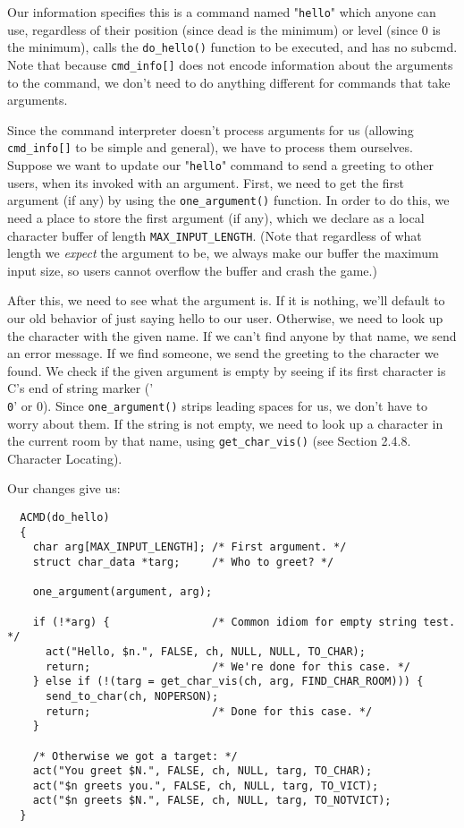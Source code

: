 \documentclass[11pt]{article}
\begin{document}
Our information specifies this is a command named "\texttt{hello}" which anyone can use, regardless of their position (since dead is the minimum) or level (since 0 is the minimum), calls the \texttt{do\_hello()} function to be executed, and has no subcmd.  Note that because \texttt{cmd\_info[]} does not encode information about the arguments to the command, we don't need to do anything different for commands that take arguments.
\par
Since the command interpreter doesn't process arguments for us (allowing \texttt{cmd\_info[]} to be simple and general), we have to process them ourselves.  Suppose we want to update our "\texttt{hello}" command to send a greeting to other users, when its invoked with an argument.  First, we need to get the first argument (if any) by using the \texttt{one\_argument()} function.  In order to do this, we need a place to store the first argument (if any), which we declare as a local character buffer of length \texttt{MAX\_INPUT\_LENGTH}.  (Note that regardless of what length we {\em expect} the argument to be, we always make our buffer the maximum input size, so users cannot overflow the buffer and crash the game.)
\par
After this, we need to see what the argument is.  If it is nothing, we'll default to our old behavior of just saying hello to our user.  Otherwise, we need to look up the character with the given name.  If we can't find anyone by that name, we send an error message.  If we find someone, we send the greeting to the character we found.  We check if the given argument is empty by seeing if its first character is C's end of string marker ('\texttt{\\0}' or 0).  Since \texttt{one\_argument()} strips leading spaces for us, we don't have to worry about them.  If the string is not empty, we need to look up a character in the current room by that name, using \texttt{get\_char\_vis()} (see Section 2.4.8. Character Locating).
\par
Our changes give us:
\begin{verbatim}
  ACMD(do_hello)
  {
    char arg[MAX_INPUT_LENGTH]; /* First argument. */
    struct char_data *targ;     /* Who to greet? */

    one_argument(argument, arg);

    if (!*arg) {                /* Common idiom for empty string test. */
      act("Hello, $n.", FALSE, ch, NULL, NULL, TO_CHAR);
      return;                   /* We're done for this case. */
    } else if (!(targ = get_char_vis(ch, arg, FIND_CHAR_ROOM))) {
      send_to_char(ch, NOPERSON);
      return;                   /* Done for this case. */
    }

    /* Otherwise we got a target: */
    act("You greet $N.", FALSE, ch, NULL, targ, TO_CHAR);
    act("$n greets you.", FALSE, ch, NULL, targ, TO_VICT);
    act("$n greets $N.", FALSE, ch, NULL, targ, TO_NOTVICT);
  }
\end{verbatim}
\end{document}
